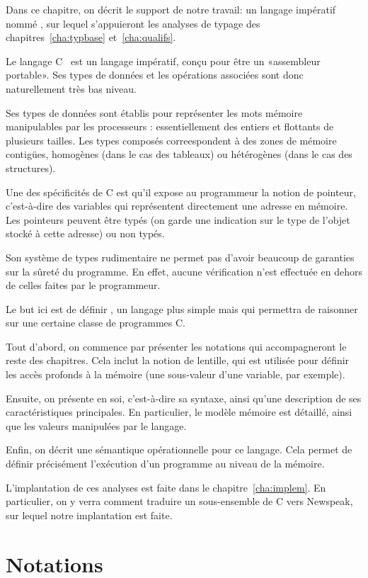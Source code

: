 Dans ce chapitre, on décrit le support de notre travail: un langage impératif
nommé \langname, sur lequel s'appuieront les analyses de typage des
chapitres~\ref{cha:typbase} et~\ref{cha:qualifs}.

Le langage C~\cite{KandR} est un langage impératif, conçu pour être un
«assembleur portable». Ses types de données et les opérations associées sont
donc naturellement très bas niveau.

Ses types de données sont établis pour représenter les mots mémoire manipulables
par les processeurs : essentiellement des entiers et flottants de plusieurs
tailles. Les types composés correespondent à des zones de mémoire contigües,
homogènes (dans le cas des tableaux) ou hétérogènes (dans le cas des
structures).

Une des spécificités de C est qu'il expose au programmeur la notion de pointeur,
c'est-à-dire des variables qui représentent directement une adresse en mémoire.
Les pointeurs peuvent être typés (on garde une indication sur le type de l'objet
stocké à cette adresse) ou non typés.

Son système de types rudimentaire ne permet pas d'avoir beaucoup de garanties
sur la sûreté du programme. En effet, aucune vérification n'est effectuée en
dehors de celles faites par le programmeur.

Le but ici est de définir \langname, un langage plus simple mais qui permettra
de raisonner sur une certaine classe de programmes C.

Tout d'abord, on commence par présenter les notations qui accompagneront le
reste des chapitres. Cela inclut la notion de lentille, qui est
utilisée pour définir les accès profonds à la mémoire (une sous-valeur d'une
variable, par exemple).

Ensuite, on présente \langname en soi, c'est-à-dire sa syntaxe, ainsi qu'une
description de ses caractéristiques principales. En particulier, le modèle
mémoire est détaillé, ainsi que les valeurs manipulées par le langage.

Enfin, on décrit une sémantique opérationnelle pour ce langage. Cela permet de
définir précisément l'exécution d'un programme \langname au niveau de la
mémoire.

L'implantation de ces analyses est faite dans le chapitre~\ref{cha:implem}. En
particulier, on y verra comment traduire un sous-ensemble de C vers Newspeak,
sur lequel notre implantation est faite.

\section{Notations}

